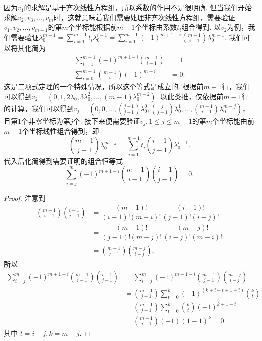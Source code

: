 因为$v_1$的求解是基于齐次线性方程组，所以系数的作用不是很明确. 但当我们开始求解$v_2, v_3, \ldots, v_m$时，这就意味着我们需要处理非齐次线性方程组，需要验证$v_1, v_2, \ldots, v_{m-1}$的第$m$个坐标能根据前$m-1$个坐标由系数$t_i$组合得到. 以$v_2$为例，我们需要验证$\lambda_0^{m-1} = \sum_{i = 1}^{m-1} t_i \lambda_0^{i-1} = \sum_{i = 1}^{m-1} (-1)^{m + 1 - i} \binom{m - 1}{i - 1} \lambda_0^{m - 1}$. 我们可以将其化简为 \begin{align*}
    \sum_{i = 1}^{m-1} (-1)^{m + 1 - i} \binom{m - 1}{i - 1} & = 1  \\
    \sum_{i = 0}^{m-1} \binom{m-1}{i} (-1)^{m - i}           & = 0.
\end{align*}
这是二项式定理的一个特殊情况，所以这个等式是成立的. 根据前$m-1$行，我们可以得到$v_2 = (0, 1, 2 \lambda_0, 3 \lambda_0^2, \ldots, (m - 1) \lambda_0^{m - 2})$. 以此类推，仅依据前$m-1$行的计算，我们可以得到$v_j = (0, 0, \ldots, \binom{j - 1}{j - 1} \lambda_0^0, \binom{j}{j - 1} \lambda_0^1, \ldots, \binom{m - 1}{j - 1} \lambda_0^{m - j})$，且第$1$个非零坐标为第$j$个. 接下来便需要验证$v_j, 1 \leqslant j \leqslant m - 1$的第$m$个坐标能由前$m-1$个坐标线性组合得到，即 \[
    \binom{m - 1}{j - 1} \lambda_0^{m - j} = \sum_{i = 1}^{m - 1} t_i \binom{i - 1}{j - 1} \lambda_0^{i - 1}.
\]
代入后化简得到需要证明的组合恒等式 \[
    \sum_{i = j}^m (-1)^{m + 1 - i} \binom{m - 1}{i - 1} \binom{i - 1}{j - 1} = 0.
\]

\begin{proof}
    注意到 \begin{align*}
        \binom{m - 1}{i - 1} \binom{i - 1}{j - 1} & = \dfrac{(m - 1)!}{(i - 1)! (m - i)!} \dfrac{(i - 1)!}{(j - 1)! (i - j)!} \\ & = \dfrac{(m - 1)!}{(j - 1)! (m - j)!} \dfrac{(m - j)!}{(i - j)! (m - i)!} \\ & = \binom{m - 1}{j - 1} \binom{m - j}{i - j},
    \end{align*}
    所以 \begin{align*}
        \sum_{i = j}^m (-1)^{m + 1 - i} \binom{m - 1}{i - 1} \binom{i - 1}{j - 1}
         & = \sum_{i = j}^m (-1)^{m + 1 - i} \binom{m - 1}{j - 1} \binom{m - j}{i - j}  \\
         & = \binom{m - 1}{j - 1} \sum_{t = 0}^k (-1)^(k + i - t  + 1 - i) \binom{k}{t} \\
         & = \binom{m - 1}{j - 1} \sum_{t = 0}^k \binom{k}{t} (-1)^{k + 1 - t}          \\
         & = \binom{m - 1}{j - 1} (-1) (1 - 1)^k = 0.
    \end{align*}
    其中 $t = i - j, k = m - j$.
\end{proof}

